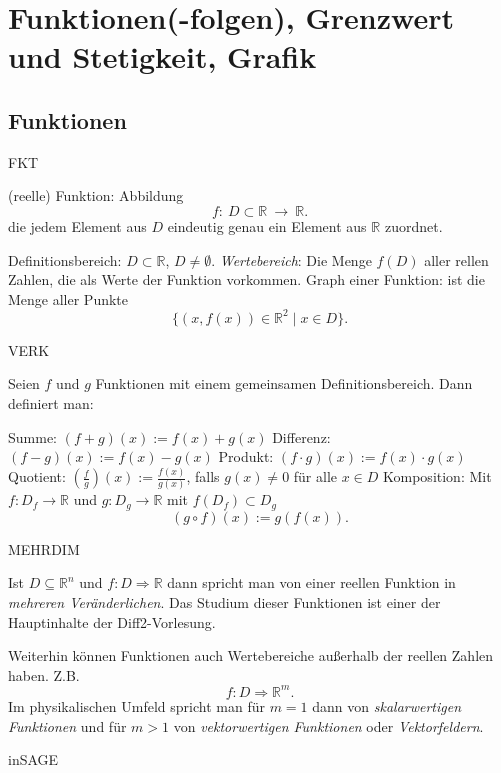 \documentclass[fontsize=12pt,paper=a4,twoside,bibtotoc,idxtotoc,
liststotoc,pagesize,BCOR1.2cm,DIV15,chapterprefix,pagesize=pdftex]{scrbook}
\theoremstyle{plain}
\theoremstyle{definition}
\theoremstyle{remark}
\begin{document}
\chapter{Funktionen(-folgen), Grenzwert und Stetigkeit, Grafik}
\section{Funktionen}

FKT

(reelle) {\color{red} Funktion}:  Abbildung
\[f: \ D \subset \mathbb{R} \ \rightarrow \ \mathbb{R}.\]
die jedem Element aus $D$ eindeutig genau ein Element aus $\mathbb{R}$ zuordnet.

  {\color{red} Definitionsbereich}: $D \subset \mathbb{R}$, $D \neq \emptyset$.
 \emph{Wertebereich}: Die Menge $f(D)$ aller rellen Zahlen, die als Werte der
Funktion vorkommen.
 {\color{red} Graph} einer Funktion: ist die Menge aller Punkte 
\[ \{ (x,f(x)) \in \mathbb{R}^2 \;|\; x \in D\}. \]


VERK

Seien $f$ und $g$ Funktionen mit einem gemeinsamen Definitionsbereich. Dann
definiert man:

 Summe: $(f+g)(x):=f(x)+g(x)$
 Differenz: $(f-g)(x):=f(x)-g(x)$
 Produkt: $(f\cdot g)(x):=f(x) \cdot g(x)$
 Quotient: $(\frac{f}{g})(x):=\frac{f(x)}{g(x)}$, falls $g(x) \neq
0$ für alle $x \in D$ 
 Komposition: Mit $f:D_f \rightarrow \mathbb{R}$ und $g:D_g \rightarrow \mathbb{R}$
mit $f(D_f) \subset D_g$ 
\[(g \circ f) (x):=g(f(x)).\] 


MEHRDIM

Ist $D \subseteq \mathbb{R}^n$ und $f : D \Rightarrow \mathbb{R}$ dann spricht man von
einer reellen Funktion in \emph{mehreren Veränderlichen}. Das Studium dieser Funktionen ist einer der Hauptinhalte der Diff2-Vorlesung.

\bigskip

Weiterhin können Funktionen auch Wertebereiche außerhalb der reellen Zahlen haben.
Z.B. 
\[f : D \Rightarrow \mathbb{R}^m.\]
 Im physikalischen Umfeld spricht man für $m=1$ dann von \emph{skalarwertigen Funktionen} und für $m>1$ von \emph{vektorwertigen Funktionen} oder \emph{Vektorfeldern}.
 
inSAGE
\end{document}
